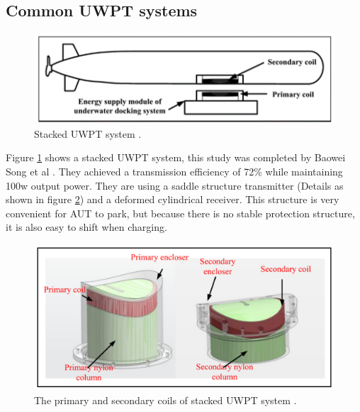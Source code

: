 \subsection{Common UWPT systems}

\begin{figure}[!b]
    \centering
    \includegraphics[width=0.7\linewidth]{images/1_stacked_UWPT_system.png}
    \caption{Stacked UWPT system \cite{Song}.}
    \label{fig:stacked UWPT system}
\end{figure}
Figure \ref{fig:stacked UWPT system} shows a stacked UWPT system, this study was completed by Baowei Song et al \cite{Song}. They achieved a transmission efficiency of 72\% while maintaining 100w output power.
They are using a saddle structure transmitter (Details as shown in figure \ref{fig:stacked UWPT system detail}) and a deformed cylindrical receiver. This structure is very convenient for AUT to park, but because there is no stable protection structure, it is also easy to shift when charging.

\begin{figure}[!b]
    \centering
    \includegraphics[width=0.7\linewidth]{images/1_stacked_UWPT_system_details.png}
    \caption{The primary and secondary coils of stacked UWPT system \cite{Song}.}
    \label{fig:stacked UWPT system detail}
\end{figure}

